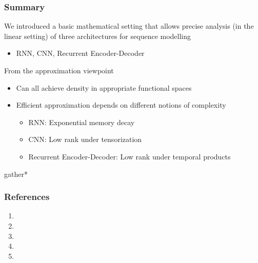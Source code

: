 \begin{frame}
	\frametitle{Summary}

	We introduced a basic mathematical setting that allows
	precise analysis (in the linear setting)
	of three architectures for sequence modelling
	\begin{itemize}
		\item RNN, CNN, Recurrent Encoder-Decoder
	\end{itemize}

	From the approximation viewpoint
	\begin{itemize}
		\item Can all achieve density in appropriate functional spaces
		\item Efficient approximation depends on different notions of complexity
		\begin{itemize}
			\item RNN: Exponential memory decay
			\item CNN: Low rank under tensorization
			\item Recurrent Encoder-Decoder:
			Low rank under temporal products
		\end{itemize}
	\end{itemize}

	\begin{empheq}[box=\mymath]{gather*}
    \end{empheq}

\end{frame}

\begin{frame}
	\frametitle{References}

	\begin{enumerate}
		\item
		\item
		\item
		\item
		\item
	\end{enumerate}


\end{frame}